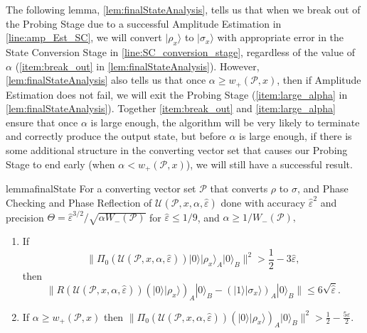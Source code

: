 \documentclass[cleveref, autoref, thm-restate,11pt]{article}
\theoremstyle{definition}
\newcommand{\sop}[1]{{\mathcal #1}}
\newcommand{\ket}[1]{|#1\rangle}
\renewcommand{\wp}[2]{{w_+({#1},{#2})}}
\newcommand{\Up}[4]{{\sop U({#1},{#2},{#3},{#4})}}
\begin{document}
The following lemma, \cref{lem:finalStateAnalysis}, tells us that when we break out of the Probing Stage due to
a successful Amplitude Estimation in \cref{line:amp_Est_SC}, we will convert $\ket{\rho_x}$
to $\ket{\sigma_x}$ with appropriate error in the State Conversion Stage in \cref{line:SC_conversion_stage}, regardless of the value of $\alpha$ (\cref{item:break_out} in \cref{lem:finalStateAnalysis}). However, \cref{lem:finalStateAnalysis} also tells us that once $\alpha\geq \wp{\mathscr P}{x}$,
then if Amplitude Estimation does not fail, we will exit the Probing Stage (\cref{item:large_alpha} in \cref{lem:finalStateAnalysis}). Together \cref{item:break_out} and \cref{item:large_alpha} ensure that once $\alpha$ is large enough, the algorithm will be very likely to terminate and correctly produce the output state, but before $\alpha$ is large enough, if there is some additional structure in the converting
vector set that causes our Probing Stage to end early (when $\alpha< \wp{\mathscr P}{x}$), we will still have a successful result.

\begin{restatable}{lemma}{finalState}\label{lem:finalStateAnalysis}
For a converting vector set $\mathscr P$ that converts $\rho$ to $\sigma$, and Phase Checking and Phase Reflection of $\Up{\mathscr
 P}{x}{\alpha}{\hat{\varepsilon}}$ done with accuracy $\hat{\varepsilon}^2$ and 
precision $\Theta = \hat{\varepsilon}^{3/2}/\sqrt{\alpha W_-(\mathscr P)}$ 
for $\hat{\varepsilon}\leq1/9$, and $\alpha\geq 1/W_-(\mathscr{P}),$
\begin{enumerate}
\item If 
\begin{equation}\label{eq:condition_breaking}
\|\Pi_0(\Up{\mathscr P}{x}{\alpha}{\hat{\varepsilon}})\ket{0}\ket{\rho_x}_A\ket{0}_B\|^2> \frac{1}{2}-3\hat{\varepsilon},
\end{equation}
then 
 \begin{equation}\label{eq:SC_success}
 \|R(\Up{\mathscr{P}}{x}{\alpha}{\hat{\varepsilon}})(\ket{0}\ket{\rho_x})_A\ket{0}_B-(\ket{1}\ket{\sigma_x})_A\ket{0}_B\|\leq 6\sqrt{\hat{\varepsilon}}.
 \end{equation} \label{item:break_out}
 \item If $\alpha\geq \wp{\mathscr P}{x}$
then $\|\Pi_0(\Up{\mathscr P}{x}{\alpha}{\hat{\varepsilon}})(\ket{0}\ket{\rho_x})_A\ket{0}_B\|^2> \frac{1}{2}-\frac{5\hat{\varepsilon}}{2}$.
\label{item:large_alpha}
\end{enumerate}
\end{restatable}
\end{document}
